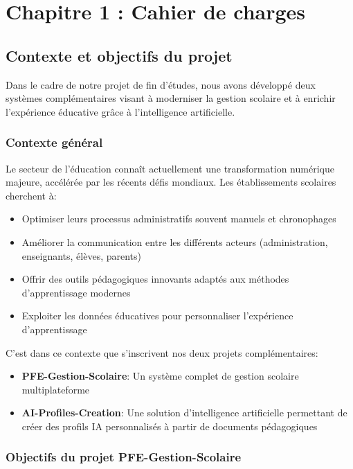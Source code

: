 \chapter*{Chapitre 1 : Cahier de charges}
\thispagestyle{fancy}
\setcounter{section}{0}
\newpage

\section{Contexte et objectifs du projet}

Dans le cadre de notre projet de fin d'études, nous avons développé deux systèmes complémentaires visant à moderniser la gestion scolaire et à enrichir l'expérience éducative grâce à l'intelligence artificielle.

\subsection{Contexte général}

Le secteur de l'éducation connaît actuellement une transformation numérique majeure, accélérée par les récents défis mondiaux. Les établissements scolaires cherchent à:

\begin{itemize}
  \item Optimiser leurs processus administratifs souvent manuels et chronophages
  \item Améliorer la communication entre les différents acteurs (administration, enseignants, élèves, parents)
  \item Offrir des outils pédagogiques innovants adaptés aux méthodes d'apprentissage modernes
  \item Exploiter les données éducatives pour personnaliser l'expérience d'apprentissage
\end{itemize}

C'est dans ce contexte que s'inscrivent nos deux projets complémentaires:

\begin{itemize}
  \item \textbf{PFE-Gestion-Scolaire}: Un système complet de gestion scolaire multiplateforme
  \item \textbf{AI-Profiles-Creation}: Une solution d'intelligence artificielle permettant de créer des profils IA personnalisés à partir de documents pédagogiques
\end{itemize}

\subsection{Objectifs du projet PFE-Gestion-Scolaire}

